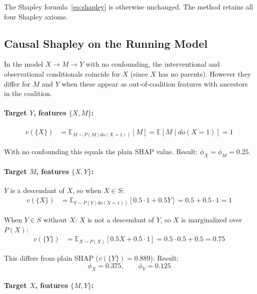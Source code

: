 \documentclass[12pt]{article}
\begin{document}
The Shapley formula~\eqref{eq:shapley} is otherwise unchanged. The method retains all four
Shapley axioms.

\subsection{Causal Shapley on the Running Model}

In the model $X \to M \to Y$ with no confounding, the interventional and observational
conditionals coincide for $X$ (since $X$ has no parents). However they differ for $M$ and $Y$
when these appear as out-of-coalition features with ancestors in the coalition.

\paragraph{Target $Y$, features $\{X, M\}$:}

\begin{align}
v(\{X\}) &= \mathbb{E}_{M \sim P(M \mid do(X=1))}[M] = \mathbb{E}[M \mid do(X=1)] = 1
\end{align}

With no confounding this equals the plain SHAP value. Result: $\phi_X = \phi_M = 0.25$.

\paragraph{Target $M$, features $\{X, Y\}$:}

$Y$ is a descendant of $X$, so when $X \in S$:
\begin{align}
v(\{X\}) &= \mathbb{E}_{Y \sim P(Y \mid do(X=1))}[0.5\cdot 1 + 0.5Y]
         = 0.5 + 0.5 \cdot 1 = 1
\end{align}

When $Y \in S$ without $X$: $X$ is not a descendant of $Y$, so $X$ is marginalized over $P(X)$:
\begin{align}
v(\{Y\}) &= \mathbb{E}_{X \sim P(X)}[0.5X + 0.5\cdot 1] = 0.5\cdot 0.5 + 0.5 = 0.75
\end{align}

This differs from plain SHAP ($v(\{Y\}) = 0.889$). Result:
\begin{equation}
\phi_X = 0.375, \qquad \phi_Y = 0.125
\end{equation}

\paragraph{Target $X$, features $\{M, Y\}$:}
\end{document}
